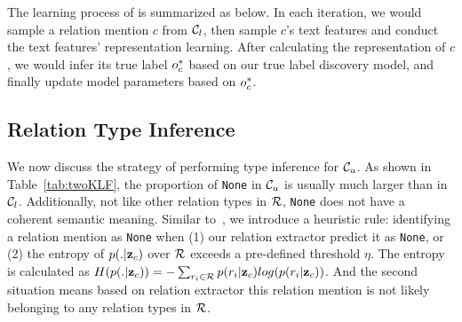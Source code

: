 The learning process of \our is summarized as below. In each iteration, we would sample a relation mention $c$ from $\mathcal{C}_l$, then sample $c$'s text features and conduct the text features' representation learning. After calculating the representation of $c$, we would infer its true label $o_c^*$ based on our true label discovery model, and finally update model parameters based on $o_c^*$.


\subsection{Relation Type Inference}
\label{subsec:type_infer}
We now discuss the strategy of performing type inference for $\mathcal{C}_u$.
As shown in Table~\ref{tab:twoKLF}, the proportion of \texttt{None} in $\mathcal{C}_u$ is usually much larger than in $\mathcal{C}_l$. 
Additionally, not like other relation types in $\mathcal{R}$, \texttt{None} does not have a coherent semantic meaning. Similar to~\cite{ren2016cotype}, we introduce a heuristic rule: identifying a relation mention as \texttt{None} when (1) our relation extractor predict it as \texttt{None}, or (2) the entropy of {\small $p(. | \mathbf{z}_c)$} over $\mathcal{R}$ exceeds a pre-defined threshold $\eta$. 
The entropy is calculated as {\small $H(p(. | \mathbf{z}_c)) = - \sum_{r_i \in \mathcal{R}} p(r_i | \mathbf{z}_c) log (p(r_i | \mathbf{z}_c))$}.
And the second situation means based on relation extractor this relation mention is not likely belonging to any relation types in $\mathcal{R}$. 

